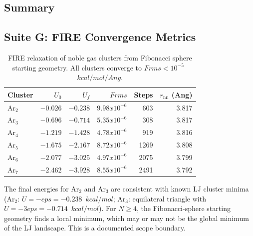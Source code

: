 \documentclass[11pt,twoside]{article}
\def\AA{Ang}%
\def\times{x}%
\def\varepsilon{eps}%
\def\kcalmol{kcal/mol}%
\def\Angstrom{Ang}%
\def\Frms{Frms}%
\newcommand{\Angstrom}{\text{\AA}}
\newcommand{\kcalmol}{\text{kcal/mol}}
\newcommand{\Frms}{F_{\mathrm{rms}}}
\begin{document}
\subsection{Summary}

\begin{center}
\end{center}

\subsection{Suite G: FIRE Convergence Metrics}

\begin{table}[H]
\centering
\caption{FIRE relaxation of noble gas clusters from Fibonacci sphere starting geometry. All clusters converge to $\Frms < 10^{-5}$~$\kcalmol/\Angstrom$.}
\label{tab:fire-results}
\begin{tabular}{lrrrrr}
\toprule
\textbf{Cluster} & $U_0$ & $U_f$ & $\Frms$ & \textbf{Steps} & $r_{\mathrm{nn}}$ (\AA) \\
\midrule
Ar$_2$ & $-0.026$ & $-0.238$ & $9.98 \times 10^{-6}$ & 603 & 3.817 \\
Ar$_3$ & $-0.696$ & $-0.714$ & $5.35 \times 10^{-6}$ & 308 & 3.817 \\
Ar$_4$ & $-1.219$ & $-1.428$ & $4.78 \times 10^{-6}$ & 919 & 3.816 \\
Ar$_5$ & $-1.675$ & $-2.167$ & $8.72 \times 10^{-6}$ & 1269 & 3.808 \\
Ar$_6$ & $-2.077$ & $-3.025$ & $4.97 \times 10^{-6}$ & 2075 & 3.799 \\
Ar$_7$ & $-2.462$ & $-3.928$ & $8.55 \times 10^{-6}$ & 2491 & 3.792 \\
\bottomrule
\end{tabular}
\end{table}

The final energies for Ar$_2$ and Ar$_3$ are consistent with known LJ cluster minima (Ar$_2$: $U = -\varepsilon = -0.238$~$\kcalmol$; Ar$_3$: equilateral triangle with $U = -3\varepsilon = -0.714$~$\kcalmol$). For $N \geq 4$, the Fibonacci-sphere starting geometry finds a local minimum, which may or may not be the global minimum of the LJ landscape. This is a documented scope boundary.
\end{document}

